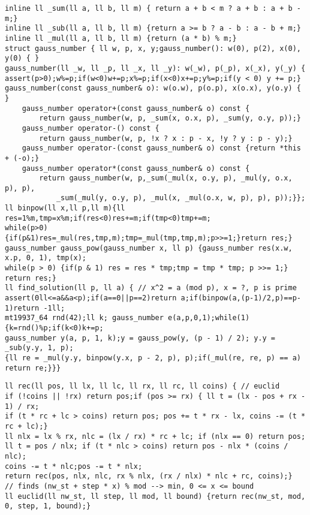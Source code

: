 \documentclass[a4paper,12pt]{article}
\begin{document}
\begin{verbatim}
inline ll _sum(ll a, ll b, ll m) { return a + b < m ? a + b : a + b - m;}
inline ll _sub(ll a, ll b, ll m) {return a >= b ? a - b : a - b + m;}
inline ll _mul(ll a, ll b, ll m) {return (a * b) % m;}
struct gauss_number { ll w, p, x, y;gauss_number(): w(0), p(2), x(0), y(0) { }
gauss_number(ll _w, ll _p, ll _x, ll _y): w(_w), p(_p), x(_x), y(_y) {
assert(p>0);w%=p;if(w<0)w+=p;x%=p;if(x<0)x+=p;y%=p;if(y < 0) y += p;}
gauss_number(const gauss_number& o): w(o.w), p(o.p), x(o.x), y(o.y) { }
    gauss_number operator+(const gauss_number& o) const {
        return gauss_number(w, p, _sum(x, o.x, p), _sum(y, o.y, p));}
    gauss_number operator-() const {
        return gauss_number(w, p, !x ? x : p - x, !y ? y : p - y);}
    gauss_number operator-(const gauss_number& o) const {return *this + (-o);}
    gauss_number operator*(const gauss_number& o) const {
        return gauss_number(w, p,_sum(_mul(x, o.y, p), _mul(y, o.x, p), p),
            _sum(_mul(y, o.y, p), _mul(x, _mul(o.x, w, p), p), p));}};
ll binpow(ll x,ll p,ll m){ll res=1%m,tmp=x%m;if(res<0)res+=m;if(tmp<0)tmp+=m;
while(p>0){if(p&1)res=_mul(res,tmp,m);tmp=_mul(tmp,tmp,m);p>>=1;}return res;}
gauss_number gauss_pow(gauss_number x, ll p) {gauss_number res(x.w, x.p, 0, 1), tmp(x);
while(p > 0) {if(p & 1) res = res * tmp;tmp = tmp * tmp; p >>= 1;} return res;}
ll find_solution(ll p, ll a) { // x^2 = a (mod p), x = ?, p is prime
assert(0ll<=a&&a<p);if(a==0||p==2)return a;if(binpow(a,(p-1)/2,p)==p-1)return -1ll;
mt19937_64 rnd(42);ll k; gauss_number e(a,p,0,1);while(1){k=rnd()%p;if(k<0)k+=p;
gauss_number y(a, p, 1, k);y = gauss_pow(y, (p - 1) / 2); y.y = _sub(y.y, 1, p);
{ll re = _mul(y.y, binpow(y.x, p - 2, p), p);if(_mul(re, re, p) == a) return re;}}}
\end{verbatim}

\begin{verbatim}
ll rec(ll pos, ll lx, ll lc, ll rx, ll rc, ll coins) { // euclid
if (!coins || !rx) return pos;if (pos >= rx) { ll t = (lx - pos + rx - 1) / rx;
if (t * rc + lc > coins) return pos; pos += t * rx - lx, coins -= (t * rc + lc);}
ll nlx = lx % rx, nlc = (lx / rx) * rc + lc; if (nlx == 0) return pos;
ll t = pos / nlx; if (t * nlc > coins) return pos - nlx * (coins / nlc);
coins -= t * nlc;pos -= t * nlx;
return rec(pos, nlx, nlc, rx % nlx, (rx / nlx) * nlc + rc, coins);}
// finds (nw_st + step * x) % mod --> min, 0 <= x <= bound
ll euclid(ll nw_st, ll step, ll mod, ll bound) {return rec(nw_st, mod, 0, step, 1, bound);}
\end{verbatim}
\end{document}
